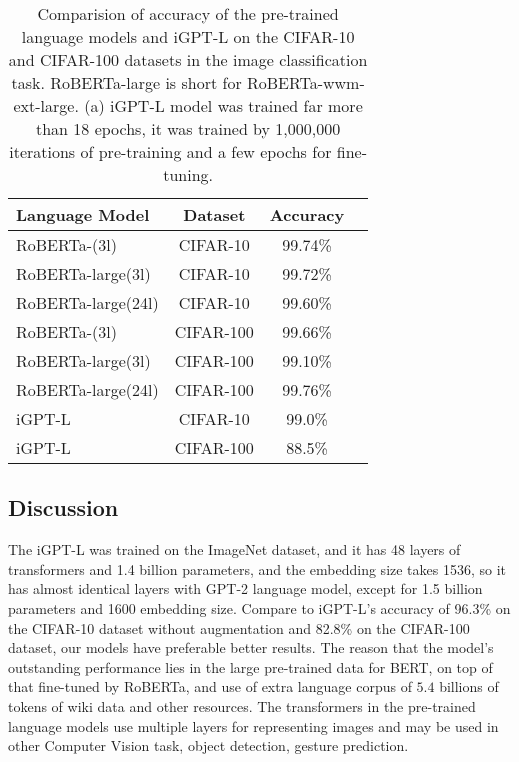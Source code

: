 \documentclass[10pt,twocolumn,letterpaper]{article}
\begin{document}
\begin{table}
\begin{center}
\begin{tabular}{|l|c|c|r|}
\hline
Language Model 	& Dataset  & Accuracy \\
\hline\hline
RoBERTa-(3l)   & CIFAR-10 	&	99.74\% \\
RoBERTa-large(3l)  & CIFAR-10 	&	99.72\% \\
RoBERTa-large(24l)  & CIFAR-10 	&	99.60\% \\
\hline
RoBERTa-(3l)    & CIFAR-100 	&	99.66\% \\
RoBERTa-large(3l)  & CIFAR-100   & 	99.10\% \\
RoBERTa-large(24l) & CIFAR-100  &	99.76\% \\
\hline\hline
iGPT-L & CIFAR-10  & 99.0\% \\
iGPT-L & CIFAR-100 & 88.5\% \\
\hline
\end{tabular}
\end{center}
\caption{Comparision of accuracy of the pre-trained language models and iGPT-L on the CIFAR-10 and CIFAR-100 datasets in the image classification task.
RoBERTa-large is short for RoBERTa-wwm-ext-large. (a) iGPT-L model was trained far more than 18 epochs, it was trained by 1,000,000 iterations of pre-training and a few epochs for fine-tuning.}
\end{table}


\subsection{Discussion}

The iGPT-L was trained on the ImageNet dataset, and it has 48 layers of transformers and 1.4 billion parameters, and the embedding size takes 1536,
so it has almost identical layers with GPT-2 language model, except for 1.5 billion parameters and 1600 embedding size.
Compare to iGPT-L's accuracy of 96.3\% on the CIFAR-10 dataset without augmentation and 82.8\% on the CIFAR-100 dataset, our models have preferable better results.
The reason that the model's outstanding performance lies in the large pre-trained data for BERT, on top of that fine-tuned by RoBERTa, and use of extra language corpus of
$5.4$ billions of tokens of wiki data and other resources.
The transformers in the pre-trained language models use multiple layers for representing images and may be used in other Computer Vision task, \eg object detection, gesture prediction.
\end{document}
